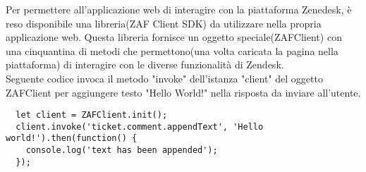 Per permettere all'applicazione web di interagire con la piattaforma Zenedesk, è reso disponibile una libreria(ZAF Client SDK) da utilizzare nella propria applicazione web. Questa libreria fornisce un oggetto speciale(ZAFClient) con una cinquantina di metodi che permettono(una volta caricata la pagina nella piattaforma) di interagire con le diverse funzionalità di Zendesk.
\\
 
Seguente codice invoca il metodo "invoke" dell'istanza "client" del oggetto ZAFClient per aggiungere testo "Hello World!" nella risposta da inviare all'utente.  
\\
\begin{lstlisting}
  let client = ZAFClient.init();
  client.invoke('ticket.comment.appendText', 'Hello world!').then(function() {
	console.log('text has been appended');
  });
\end{lstlisting} 